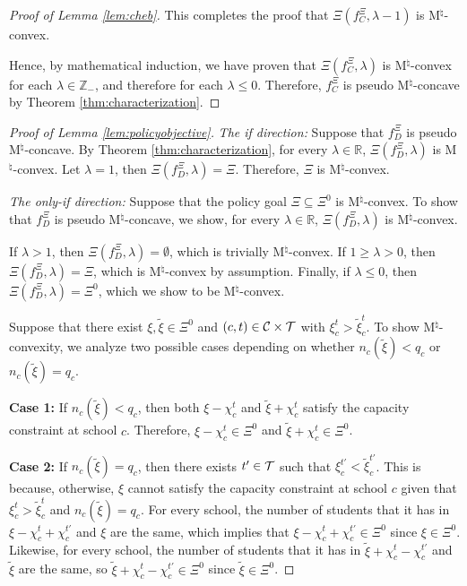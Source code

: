 \documentclass[12pt]{amsart}
\theoremstyle{remark}
\begin{document}
\begin{proof}[Proof of Lemma \ref{lem:cheb}]
This completes the proof that $\Xi(f_C^{\Xi},\lambda-1)$ is M$^{\natural}$-convex.

Hence, by mathematical induction, we have proven that  $\Xi(f_C^{\Xi},\lambda)$ is M$^{\natural}$-convex for each $\lambda \in \mathbb{Z}_-$, and therefore for each $\lambda \leq 0$. Therefore, $f_C^{\Xi}$ is pseudo M$^{\natural}$-concave by Theorem \ref{thm:characterization}.
\end{proof}

\medskip

\begin{proof}[Proof of Lemma \ref{lem:policyobjective}]
\emph{The if direction:} Suppose that $f^{\Xi}_D$ is pseudo M$^{\natural}$-concave. By Theorem \ref{thm:characterization}, for every $\lambda\in \mathbb{R}$,
$\Xi(f^{\Xi}_D,\lambda)$ is M$^{\natural}$-convex. Let $\lambda=1$, then $\Xi(f^{\Xi}_D,\lambda)=\Xi$. Therefore, $\Xi$ is M$^{\natural}$-convex.

\medskip
\noindent
\emph{The only-if direction:} Suppose that the policy goal $\Xi \subseteq \Xi^0$ is M$^{\natural}$-convex. To show that $f^{\Xi}_D$ is pseudo M$^{\natural}$-concave,
we show, for every $\lambda \in \mathbb{R}$, $\Xi(f^{\Xi}_D,\lambda)$ is M$^{\natural}$-convex.

If $\lambda>1$, then $\Xi(f^{\Xi}_D,\lambda)=\emptyset$, which is trivially M$^{\natural}$-convex. If
$1\geq \lambda>0$, then $\Xi(f^{\Xi}_D,\lambda)=\Xi$, which is M$^{\natural}$-convex by assumption.
Finally, if $\lambda \leq 0$, then $\Xi(f^{\Xi}_D,\lambda)=\Xi^0$, which we show to be M$^{\natural}$-convex.

Suppose that there exist $\xi, \tilde{\xi}\in \Xi^0$ and $(c,t) \in \mathcal{C} \times \mathcal{T}$ with $\xi_c^t>\tilde{\xi}_{c}^{t}$.
To show M$^{\natural}$-convexity, we analyze two possible cases depending on whether
$n_c(\tilde \xi) < q_c$ or $n_c(\tilde \xi) = q_c$.

\textbf{Case 1:} If $n_c(\tilde \xi) < q_c$, then both $\xi-\chi_c^t$ and $\tilde{\xi}+\chi_c^t$ satisfy the capacity constraint
at school $c$. Therefore, $\xi-\chi_c^t \in \Xi^0$ and $\tilde{\xi}+\chi_c^t \in \Xi^0$.

\textbf{Case 2:} If $n_c(\tilde \xi) = q_c$, then there exists $t'\in \mathcal{T}$ such that $\xi_c^{t'} < \tilde{\xi}_{c}^{t'}$. This is because, otherwise, $\xi$ cannot satisfy the capacity constraint at school $c$ given that
$\xi_c^t>\tilde{\xi}_{c}^{t}$ and $n_c(\tilde \xi) = q_c$.
For every school, the number of students that it has in $\xi-\chi_c^t+\chi_{c}^{t'}$ and $\xi$ are the same, which implies that
$\xi-\chi_c^t+\chi_{c}^{t'}\in \Xi^0$ since $\xi \in \Xi^0$. Likewise, for every school, the number of students that it
has in $\tilde{\xi}+\chi_c^t-\chi_{c}^{t'}$ and $\tilde{\xi}$ are the same, so $\tilde{\xi}+\chi_c^t-\chi_{c}^{t'}\in \Xi^0$
since $\tilde{\xi}\in \Xi^0$.


\end{proof}
\end{document}
